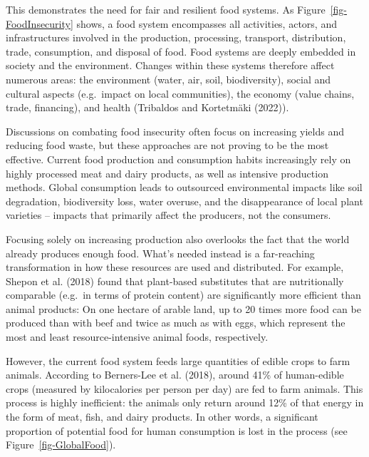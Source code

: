 \documentclass[
  a4paper,
  openany]{book}
\begin{document}
This demonstrates the need for fair and resilient food systems. As
Figure~\ref{fig-FoodInsecurity} shows, a food system encompasses all
activities, actors, and infrastructures involved in the production,
processing, transport, distribution, trade, consumption, and disposal of
food. Food systems are deeply embedded in society and the environment.
Changes within these systems therefore affect numerous areas: the
environment (water, air, soil, biodiversity), social and cultural
aspects (e.g.~impact on local communities), the economy (value chains,
trade, financing), and health (Tribaldos and Kortetmäki (2022)).

Discussions on combating food insecurity often focus on increasing
yields and reducing food waste, but these approaches are not proving to
be the most effective. Current food production and consumption habits
increasingly rely on highly processed meat and dairy products, as well
as intensive production methods. Global consumption leads to outsourced
environmental impacts like soil degradation, biodiversity loss, water
overuse, and the disappearance of local plant varieties -- impacts that
primarily affect the producers, not the consumers.

Focusing solely on increasing production also overlooks the fact that
the world already produces enough food. What's needed instead is a
far-reaching transformation in how these resources are used and
distributed. For example, Shepon et al. (2018) found that plant-based
substitutes that are nutritionally comparable (e.g.~in terms of protein
content) are significantly more efficient than animal products: On one
hectare of arable land, up to 20 times more food can be produced than
with beef and twice as much as with eggs, which represent the most and
least resource-intensive animal foods, respectively.

However, the current food system feeds large quantities of edible crops
to farm animals. According to Berners-Lee et al. (2018), around 41\% of
human-edible crops (measured by kilocalories per person per day) are fed
to farm animals. This process is highly inefficient: the animals only
return around 12\% of that energy in the form of meat, fish, and dairy
products. In other words, a significant proportion of potential food for
human consumption is lost in the process (see
Figure~\ref{fig-GlobalFood}).
\end{document}
